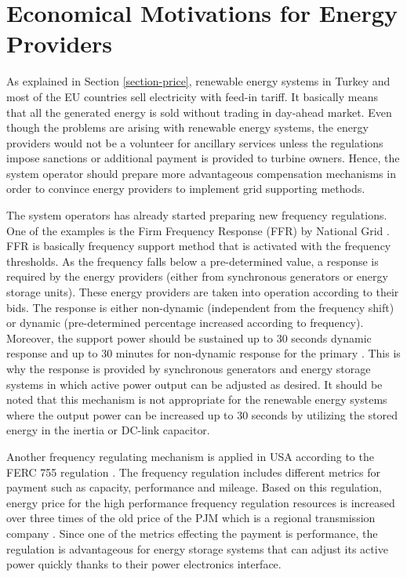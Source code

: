 \section{Economical Motivations for Energy Providers}
As explained in Section \ref{section-price}, renewable energy systems in Turkey and most of the EU countries sell electricity with feed-in tariff. It basically means that all the generated energy is sold without trading in day-ahead market. Even though the problems are arising with renewable energy systems, the energy providers would not be a volunteer for ancillary services unless the regulations impose sanctions or additional payment is provided to turbine owners. Hence, the system operator should prepare more advantageous compensation mechanisms in order to convince energy providers to implement grid supporting methods. \par
The system operators has already started preparing new frequency regulations. One of the examples is the Firm Frequency Response (FFR) by National Grid \cite{NationalGridElectricityTransmission2016}. FFR is basically frequency support method that is activated with the frequency thresholds. As the frequency falls below a pre-determined value, a response is required by the energy providers (either from synchronous generators or energy storage units). These energy providers are taken into operation according to their bids. The response is either non-dynamic (independent from the frequency shift) or dynamic (pre-determined percentage increased according to frequency). Moreover, the support power should be sustained up to 30 seconds dynamic response and up to 30 minutes for non-dynamic response for the primary \cite{Smethurst2017}. This is why the response is provided by synchronous generators and energy storage systems in which active power output can be adjusted as desired. It should be noted that this mechanism is not appropriate for the renewable energy systems where the output power can be increased up to 30 seconds by utilizing the stored energy in the inertia or DC-link capacitor.\par
Another frequency regulating mechanism is applied in USA according to the FERC 755 regulation \cite{FederalEnergyRegulatoryCommission2011}. The frequency regulation includes different metrics for payment such as capacity, performance and mileage. Based on this regulation, energy price for the high performance frequency regulation resources is increased over three times of the old price of the PJM which is a regional transmission company \cite{NECEnergySolutions2014}. Since one of the metrics effecting the payment is performance, the regulation is advantageous for energy storage systems that can adjust its active power quickly thanks to their power electronics interface.\par
